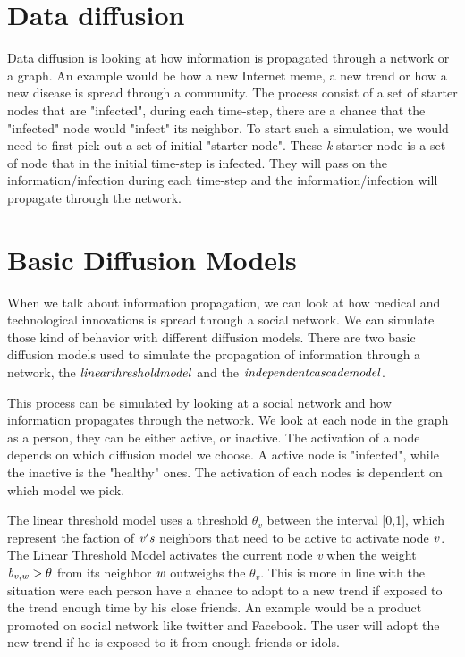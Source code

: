 \section{Data diffusion}
Data diffusion is looking at how information is propagated through a network or a graph. An example would be how a new Internet meme, a new trend or how a new disease is spread through a community. The process consist of a set of starter nodes that are "infected", during each time-step, there are a chance that the "infected" node would "infect" its neighbor. To start such a simulation, we would need to first pick out a set of initial "starter node". These {\it k} starter node is a set of node that in the initial time-step is infected. They will pass on the information/infection during each time-step and the information/infection will propagate through the network.

\section{Basic Diffusion Models}
When we talk about information propagation, we can look at how medical and technological innovations is spread through a social network. We can simulate those kind of behavior with different diffusion models. There are two basic diffusion models used to simulate the propagation of information through a network\cite{MaximizeSpread2003}, the {$\it linear threshold model$} and the $\it{ independent cascade model}$\cite{MaximizeSpread2003}.

This process can be simulated by looking at a social network and how information propagates through the network. We look at each node in the graph as a person, they can be either active, or inactive. The activation of a node depends on which diffusion model we choose. A active node is "infected", while the inactive is the "healthy" ones. The activation of each nodes is dependent on which model we pick.

The linear threshold model uses a threshold $\theta_v$ between the interval [0,1], which represent the faction of $\it{v}'s$ neighbors that need to be active to activate node $\it{v}$. The Linear Threshold Model activates the current node {\it v} when the weight ${\it b_{v,w}} > \theta$ from its neighbor $\it{w}$ outweighs the $\theta_v$. This is more in line with the situation were each person have a chance to adopt to a new trend if exposed to the trend enough time by his close friends. An example would be a product promoted on social network like twitter and Facebook. The user will adopt the new trend if he is exposed to it from enough friends or idols. 


